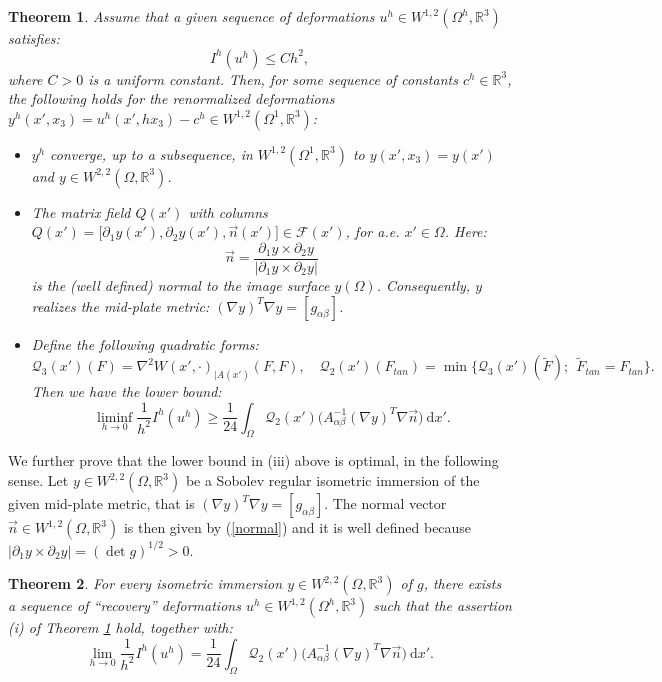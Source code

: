 \documentclass[leqno,twoside, 11pt]{amsart}
\theoremstyle{plain}
\newtheorem{theorem}{Theorem}[section]
\theoremstyle{definition}
\numberwithin{equation}{section}
\numberwithin{figure}{section}
\begin{document}
\begin{theorem}\label{liminf}
Assume that a given sequence of deformations 
$u^h\in W^{1,2}(\Omega^h,\mathbb{R}^3)$ satisfies:
\begin{equation}\label{h2}
I^h(u^h) \leq Ch^2,
\end{equation}
where $C>0$ is a uniform constant. Then, for some sequence of constants
$c^h\in \mathbb{R}^3$, the following holds for the renormalized
deformations $y^h(x', x_3) = u^h(x',hx_3) - c^h\in
W^{1,2}(\Omega^1,\mathbb{R}^3)$:
\begin{itemize}
\item[(i)] $y^h$ converge, up to a subsequence, in $W^{1,2}(\Omega^1,\mathbb{R}^3)$ to
$y(x',x_3) = y(x')$ and $y\in W^{2,2}(\Omega,  \mathbb{R}^3)$.
\item[(ii)] The matrix field $Q(x')$ with columns
$Q(x') = \Big[\partial_1 y(x'), \partial_2 y(x'), \vec n(x')\Big]\in
\mathcal{F}(x')$, for a.e. $x'\in \Omega$.
Here:
\begin{equation}\label{normal}
\vec n = \frac{\partial_1 y\times\partial_2 y}
{|\partial_1 y\times\partial_2y|}
\end{equation}
is the (well defined) normal to the image surface $y(\Omega)$.
Consequently, $y$ realizes the mid-plate
metric: $(\nabla y)^T\nabla y = [g_{\alpha\beta}]$.
\item[(iii)] Define the following quadratic forms:
$$\mathcal{Q}_3(x')(F) = \nabla^2 W (x', \cdot)_{\mid A(x')}(F,F),
\quad \mathcal{Q}_2(x')(F_{tan})
= \min\{\mathcal{Q}_3(x')(\tilde F); ~~ \tilde F_{tan}
= F_{tan} \}.$$
Then we have the lower bound:
$$\liminf_{h\to 0} \frac{1}{h^2} I^h(u^h)\geq  \frac{1}{24}\int_\Omega
\mathcal{Q}_2(x') \Big(A_{\alpha\beta}^{-1} (\nabla y)^T
\nabla\vec n\Big)~\mathrm{d}x'.$$
\end{itemize}
\end{theorem}

We further prove that the lower bound in (iii) above is optimal, in the 
following sense. 
Let $y\in W^{2,2}(\Omega,\mathbb{R}^3)$ be a Sobolev regular isometric
immersion of the given mid-plate metric, that is 
$(\nabla y)^T\nabla y = [g_{\alpha\beta}]$.
The normal vector $\vec n\in W^{1,2}(\Omega, \mathbb{R}^3)$ is then given by
(\ref{normal}) and it is well defined because
$|\partial_1 y\times\partial_2 y| = (\det g)^{1/2}>0$.

\begin{theorem}\label{threcseq}
For every isometric immersion $y\in W^{2,2}(\Omega,\mathbb{R}^3)$ of $g$,
there exists a sequence of ``recovery'' deformations
$u^h\in W^{1,2}(\Omega^h,\mathbb{R}^3)$ such that the assertion (i) of
Theorem \ref{liminf} hold, together with:
\begin{equation}\label{limexact}
\lim_{h\to 0} \frac{1}{h^2} I^h(u^h) = \frac{1}{24}\int_\Omega
\mathcal{Q}_2(x') \Big(A_{\alpha\beta}^{-1} (\nabla y)^T
\nabla\vec n\Big)~\mathrm{d}x'.
\end{equation}
\end{theorem}
\end{document}
